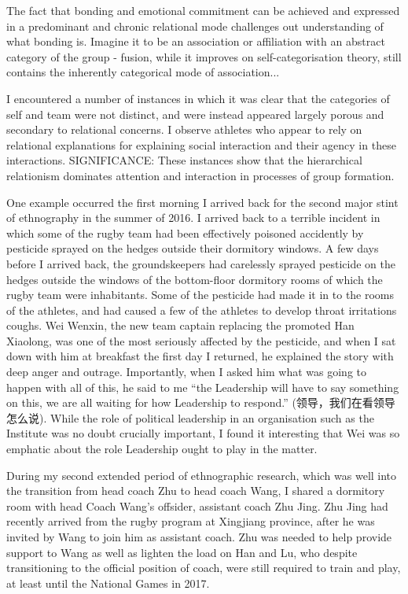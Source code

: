 \begin{CJK}{UTF8}{gbsn}
  The fact that bonding and emotional commitment can be achieved and expressed in a predominant and chronic relational mode challenges out understanding of what bonding is.  Imagine it to be an association or affiliation with an abstract category of the group - fusion, while it improves on self-categorisation theory, still contains the inherently categorical mode of association...



  I encountered a number of instances in which it was clear that the categories of self and team were not distinct, and were instead appeared largely porous and secondary to relational concerns. I observe athletes who appear to rely on relational explanations for explaining social interaction and their agency in these interactions.
  SIGNIFICANCE:  These instances show that the hierarchical relationism dominates attention and interaction in processes of group formation.

  One example occurred the first morning I arrived back for the second major stint of ethnography in the summer of 2016. I arrived back to a terrible incident in which some of the rugby team had been effectively poisoned accidently by pesticide sprayed on the hedges outside their dormitory windows.  A few days before I arrived back, the groundskeepers had carelessly sprayed pesticide on the hedges outside the windows of the bottom-floor dormitory rooms of which the rugby team were inhabitants.  Some of the pesticide had made it in to the rooms of the athletes, and had caused a few of the athletes to develop throat irritations coughs.  Wei Wenxin, the new team captain replacing the promoted Han Xiaolong, was one of the most seriously affected by the pesticide, and when I sat down with him at breakfast the first day I returned, he explained the story with deep anger and outrage.  Importantly, when I asked him what was going to happen with all of this, he said to me ``the Leadership will have to say something on this, we are all waiting for how Leadership to respond.'' (领导，我们在看领导怎么说). While the role of political leadership in an organisation such as the Institute was no doubt crucially important, I found it interesting that Wei was so emphatic about the role Leadership ought to play in the matter.

  During my second extended period of ethnographic research, which was well into the transition from head coach Zhu to head coach Wang, I shared a dormitory room with head Coach Wang's offsider, assistant coach Zhu Jing.  Zhu Jing had recently arrived from the rugby program at Xingjiang province, after he was invited by Wang to join him as assistant coach.  Zhu was needed to help provide support to Wang as well as lighten the load on Han and Lu, who despite transitioning to the official position of coach, were still required to train and play, at least until the National Games in 2017.


\end{CJK}

